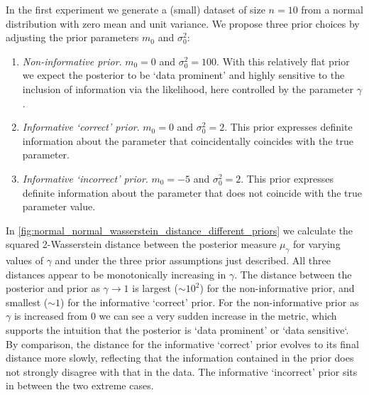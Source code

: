 \documentclass[12pt]{article}
\begin{document}
In the first experiment we generate a (small) dataset of size $n = 10$ from a
normal distribution with zero mean and unit variance. We propose three prior
choices by adjusting the prior parameters $m_0$ and $\sigma_0^2$:
\begin{enumerate}
\item \emph{Non-informative prior}. $m_0 = 0$ and $\sigma_0^2 = 100$. With
this relatively flat prior we expect the posterior to be `data prominent'
and highly sensitive to the inclusion of information via the likelihood,
here controlled by the parameter $\gamma$.
\item \emph{Informative `correct' prior}. $m_0 = 0$ and $\sigma_0^2 = 2$.
This prior expresses definite information about the parameter that
coincidentally coincides with the true parameter. 
\item \emph{Informative `incorrect' prior}. $m_0 = -5$ and $\sigma_0^2 = 2$.
This prior expresses definite information about the parameter that
does not coincide with the true parameter value. 
\end{enumerate}
In \cref{fig:normal_normal_wasserstein_distance_different_priors} we calculate
the squared 2-Wasserstein distance between the posterior measure $\mu_\gamma$
for varying values of $\gamma$ and under the three prior assumptions just
described. All three distances appear to be monotonically increasing in
$\gamma$. The distance between the posterior and prior as $\gamma \to 1$ is
largest ($\sim10^2$) for the non-informative prior, and smallest ($\sim 1$) for
the informative `correct' prior. For the non-informative prior as $\gamma$ is
increased from $0$ we can see a very sudden increase in the metric, which
supports the intuition that the posterior is `data prominent' or `data
sensitive`. By comparison, the distance for the informative `correct' prior
evolves to its final distance more slowly, reflecting that the information
contained in the prior does not strongly disagree with that in the data. The
informative `incorrect' prior sits in between the two extreme cases.
\end{document}
